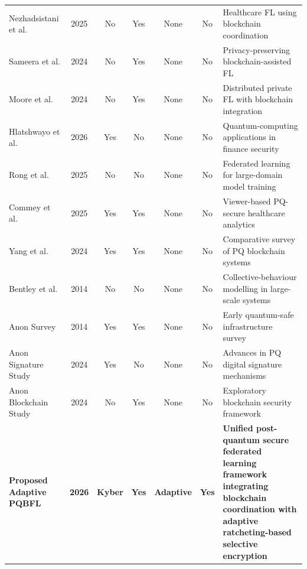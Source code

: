 \documentclass[journal, 10pt, twocolumn]{IEEEtran}
\begin{document}
\begin{table}[htbp]
\begin{tabularx}{\textwidth}{l c c c c c X}
Nezhadsistani et al. \cite{nezhadsistani2025}
& 2025 & No & Yes & None & No
& Healthcare FL using blockchain coordination \\

Sameera et al. \cite{sameera2024}
& 2024 & No & Yes & None & No
& Privacy-preserving blockchain-assisted FL \\

Moore et al. \cite{moore2024}
& 2024 & No & Yes & None & No
& Distributed private FL with blockchain integration \\

Hlatshwayo et al. \cite{hlatshwayo2026}
& 2026 & Yes & No & None & No
& Quantum-computing applications in finance security \\

Rong et al. \cite{rong2025}
& 2025 & No & No & None & No
& Federated learning for large-domain model training \\

Commey et al. \cite{commey2025_health}
& 2025 & Yes & Yes & None & No
& Viewer-based PQ-secure healthcare analytics \\

Yang et al. \cite{yang2024_survey2}
& 2024 & Yes & Yes & None & No
& Comparative survey of PQ blockchain systems \\

Bentley et al. \cite{bentley2014}
& 2014 & No & No & None & No
& Collective-behaviour modelling in large-scale systems \\

Anon Survey \cite{anon_survey_qsafe}
& 2014 & Yes & Yes & None & No
& Early quantum-safe infrastructure survey \\

Anon Signature Study \cite{anon_pdf1}
& 2024 & Yes & No & None & No
& Advances in PQ digital signature mechanisms \\

Anon Blockchain Study \cite{anon_crdownload}
& 2024 & No & Yes & None & No
& Exploratory blockchain security framework \\

\midrule

\textbf{Proposed Adaptive PQBFL}
& \textbf{2026}
& \textbf{Kyber}
& \textbf{Yes}
& \textbf{Adaptive}
& \textbf{Yes}
& \textbf{Unified post-quantum secure federated learning framework integrating blockchain coordination with adaptive ratcheting-based selective encryption}

\\
\bottomrule
\end{tabularx}
\end{table}
\end{document}
